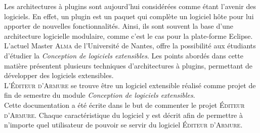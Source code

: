 

Les architectures à plugins sont aujourd'hui considérées comme étant l'avenir des logiciels. En effet, un plugin est un paquet qui complète un logiciel hôte pour lui apporter de nouvelles fonctionnalités. Ainsi, ils sont souvent la base d’une architecture logicielle modulaire, comme c’est le cas pour la plate-forme Eclipse.\\

L'actuel Master \textsc{Alma} de l’Université de Nantes, offre la possibilité aux étudiants d'étudier la \textit{Conception de logiciels extensibles}. Les points abordés dans cette matière présentent plusieurs techniques d'architectures à plugins, permettant de développer des logiciels extensibles. \\

L'\textsc{\'Editeur d'Armure} se trouve être un logiciel extensible réalisé comme projet de fin de semestre du module \textit{Conception de logiciels extensibles}.\\

Cette documentation a été écrite dans le but de commenter le projet \textsc{\'Editeur d'Armure}. Chaque caractéristique du logiciel y est décrit afin de permettre à n’importe quel utilisateur de pouvoir se servir du logiciel \textsc{\'Editeur d'Armure}.

